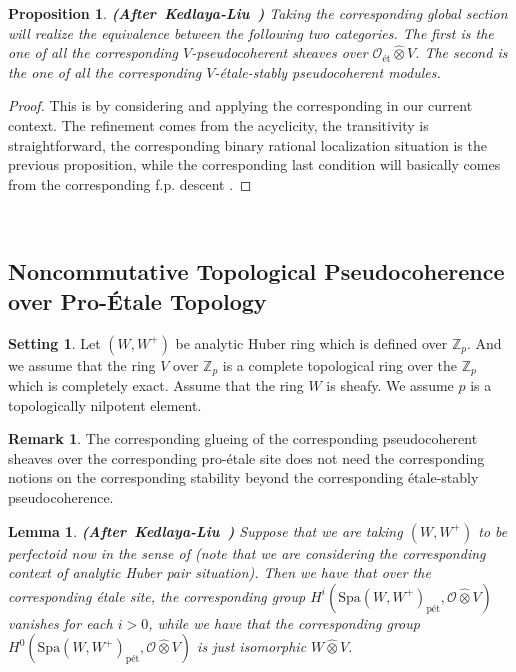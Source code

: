 \documentclass[12pt]{amsart}
\newtheorem{lemma}[theorem]{Lemma}
\newtheorem{proposition}[theorem]{Proposition}
\theoremstyle{definition}
\newtheorem{remark}[theorem]{Remark}
\numberwithin{equation}{section}
\newtheorem{setting}[theorem]{Setting}
\begin{document}
\begin{proposition} \mbox{\bf{(After Kedlaya-Liu \cite[Theorem 2.5.14]{KL2})}}
Taking the corresponding global section will realize the equivalence between the following two categories. The first is the one of all the corresponding $V$-pseudocoherent sheaves over $\mathcal{O}_{\text{\'et}}\widehat{\otimes}V$. The second is the one of all the corresponding $V$-\'etale-stably pseudocoherent modules.	
\end{proposition}


\begin{proof}
This is by considering and applying the corresponding \cite[Lemma 1.10.4]{Ked1} in our current context. The refinement comes from the acyclicity, the transitivity is straightforward, the corresponding binary rational localization situation is the previous proposition, while the corresponding last condition will basically comes from the corresponding f.p. descent \cite[Chapitre VIII]{SGAI}.	
\end{proof}






\
\subsection{Noncommutative Topological Pseudocoherence over Pro-\'Etale Topology}



\begin{setting}
Let $(W,W^+)$ be analytic Huber ring which is defined over $\mathbb{Z}_p$. And we assume that the ring $V$ over $\mathbb{Z}_p$ is a complete topological ring over the $\mathbb{Z}_p$ which is completely exact. Assume that the ring $W$ is sheafy. We assume $p$ is a topologically nilpotent element.
\end{setting}



\begin{remark}
The corresponding glueing of the corresponding pseudocoherent sheaves over the corresponding pro-\'etale site does not need the corresponding notions on the corresponding stability beyond the corresponding \'etale-stably pseudocoherence.	
\end{remark}


\begin{lemma} \mbox{\bf{(After Kedlaya-Liu \cite[Proposition 3.4.3]{KL2})}}
Suppose that we are taking $(W,W^+)$ to be perfectoid now in the sense of \cite[Definition 2.1.1]{Ked1} (note that we are considering the corresponding context of analytic Huber pair situation). Then we have that over the corresponding \'etale site, the corresponding group $H^i(\mathrm{Spa}(W,W^+)_\text{p\'et},\mathcal{O}\widehat{\otimes}V)$ vanishes for each $i>0$, while we have that the corresponding group $H^0(\mathrm{Spa}(W,W^+)_\text{p\'et},\mathcal{O}\widehat{\otimes}V)$ is just isomorphic $W\widehat{\otimes}V$.	
\end{lemma}
\end{document}
